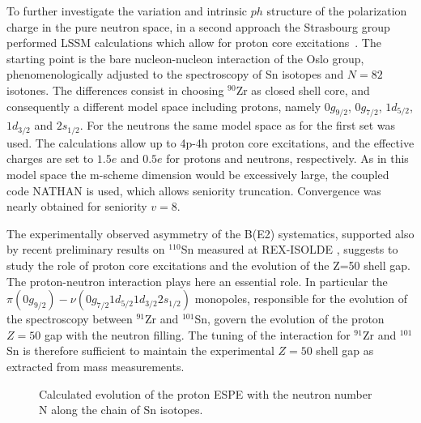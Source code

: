 \documentclass[prc,twocolumn,amssymb,amsmath,showpacs,superscriptaddress]{revtex4}
\begin{document}
To further investigate the variation and intrinsic $ph$ structure
of the polarization charge in the pure neutron space, in a second
approach the Strasbourg group performed LSSM calculations which
allow for proton core excitations~\cite{gni05}. The starting point
is the bare nucleon-nucleon interaction of the Oslo group,
phenomenologically adjusted to the spectroscopy of Sn isotopes and
$N = 82$ isotones. The differences consist in choosing $^{90}$Zr
as closed shell core, and consequently a different model space
including protons, namely $0g_{9/2}$, $0g_{7/2}$, $1d_{5/2}$,
$1d_{3/2}$ and $2s_{1/2}$. For the neutrons the same model space
as for the first set was used. The calculations allow up to 4p-4h
proton core excitations, and the effective charges are set to
$1.5e$ and $0.5e$ for protons and neutrons, respectively. As in
this model space the m-scheme dimension \cite{cau02} would be
excessively large, the coupled code NATHAN \cite{cau02} is used,
which allows seniority truncation. Convergence was nearly obtained
for seniority $v=8$.

The experimentally observed asymmetry of the B(E2) systematics,
supported also by recent preliminary results on $^{110}$Sn
measured at REX-ISOLDE \cite{ced05}, suggests to study the role of
proton core excitations and the evolution of the Z=50 shell gap.
The proton-neutron interaction plays here an essential role. In
particular the
$\pi(0g_{9/2})-\nu(0g_{7/2}1d_{5/2}1d_{3/2}2s_{1/2})$ monopoles,
responsible for the evolution of the spectroscopy between
$^{91}$Zr and $^{101}$Sn, govern the evolution of the proton
$Z=50$ gap with the neutron filling. The tuning of the interaction
for $^{91}$Zr and $^{101}$Sn is therefore sufficient to maintain
the experimental $Z=50$ shell gap as extracted from mass
measurements.
\begin{figure}[hhh]\hspace{-1.3cm}
\centering\mbox{}
\vspace{-10pt}\caption{\small Calculated evolution of the proton ESPE
with the neutron number N along the chain of Sn isotopes.} \label{fig:ESPE}
\end{figure}
\end{document}
